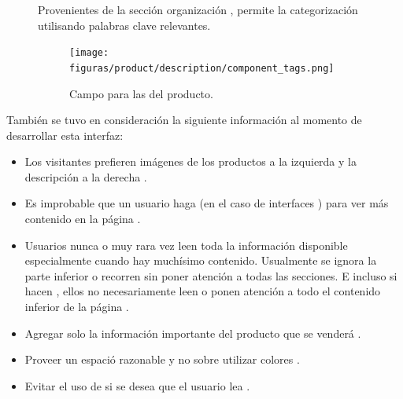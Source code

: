 \begin{description}
			\item [\tagsForm]
				Provenientes de la sección organización , permite la categorización utilisando palabras clave relevantes.

				\begin{figure}[H]
					\centering
					\texttt{[image: figuras/product/description/component\_tags.png]}

					\caption{Campo para las \tagsForm del producto.}
					\label{figure:product:description:component_tags}
				\end{figure}
				
		\end{description}

		También se tuvo en consideración la siguiente información al momento de desarrollar esta interfaz:

		\begin{itemize}
			\item Los visitantes prefieren imágenes de los productos a la izquierda y la descripción a la derecha \cite{online_cxpartners_official_people_see_to_buy}.
			\item Es improbable que un usuario haga \scrollCPT(en el caso de interfaces \desktop) para ver más contenido en la página \cite{online_cxpartners_official_people_see_to_buy}.
			\item Usuarios nunca o muy rara vez leen toda la información disponible especialmente cuando hay muchísimo contenido. Usualmente se ignora la parte inferior o recorren sin poner atención a todas las secciones. E incluso si hacen \scrollCPT, ellos no necesariamente leen o ponen atención a todo el contenido inferior de la página \cite{online_cxpartners_official_people_see_to_buy}.
			\item Agregar solo la información importante del producto que se venderá \cite{online_cxpartners_official_people_see_to_buy}.

			\item Proveer un espació razonable y no sobre utilizar colores \cite{online_cxpartners_official_people_see_to_buy}.

			\item Evitar el uso de \clicking si se desea que el usuario lea \cite{online_cxpartners_official_people_see_to_buy}.
		\end{itemize}


